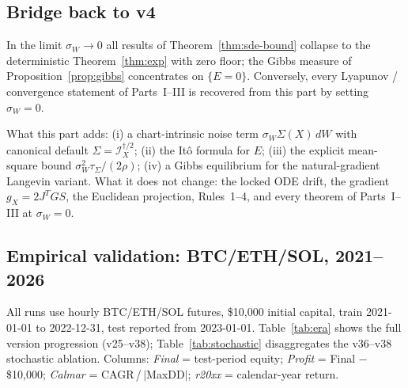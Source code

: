 \documentclass[11pt,oneside]{amsart}
\def\textbf#1{#1}%
\theoremstyle{plain}
\theoremstyle{definition}
\newcommand{\gX}{g_X}
\begin{document}
\subsection{Bridge back to v4}

In the limit $\sigma_W\to 0$ all results of Theorem~\ref{thm:sde-bound}
collapse to the deterministic Theorem~\ref{thm:exp} with zero floor;
the Gibbs measure of Proposition~\ref{prop:gibbs} concentrates on
$\{E=0\}$. Conversely, every Lyapunov / convergence statement of
Parts~I--III is recovered from this part by setting $\sigma_W=0$.

\begin{lockbox}
\textbf{What this part adds:} (i) a chart-intrinsic noise term
$\sigma_W\Sigma(X)\,dW$ with canonical default
$\Sigma=\mathcal{I}_X^{\dagger/2}$; (ii) the It\^o formula for $E$;
(iii) the explicit mean-square bound
$\sigma_W^{2}\tau_\Sigma/(2\rho)$; (iv) a Gibbs equilibrium for the
natural-gradient Langevin variant. \textbf{What it does not change:}
the locked ODE drift, the gradient $\gX = 2J^TGS$, the Euclidean
projection, Rules~1--4, and every theorem of Parts~I--III at
$\sigma_W=0$.
\end{lockbox}

\subsection{Empirical validation: BTC/ETH/SOL, 2021--2026}
\label{sec:empirical}

All runs use hourly BTC/ETH/SOL futures, \$10{,}000 initial capital,
train 2021-01-01 to 2022-12-31, test reported from 2023-01-01.
Table~\ref{tab:era} shows the full version progression (v25--v38);
Table~\ref{tab:stochastic} disaggregates the v36--v38 stochastic
ablation.  Columns: \textit{Final} = test-period equity; \textit{Profit}
= Final $-$ \$10{,}000; \textit{Calmar} = CAGR\,/\,$|$MaxDD$|$;
\textit{r20xx} = calendar-year return.
\end{document}
